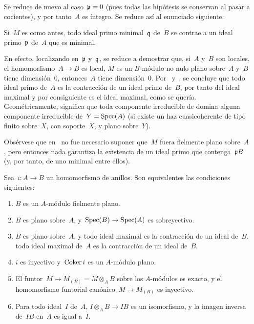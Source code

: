 Se reduce de nuevo al caso~$\mathfrak{p}=0$ (pues todas las hipótesis se
conservan al pasar a cocientes), y por tanto~$A$ es íntegro. Se reduce así al
enunciado siguiente:

\begin{corollaire}
\label{IV.2.5}
Si~$M$ es como antes, todo ideal primo minimal~$\mathfrak{q}$ de~$B$ se contrae
a un ideal primo~$\mathfrak{p}$ de~$A$ que es minimal.
\end{corollaire}

En efecto, localizando en~$\mathfrak{p}$ y~$\mathfrak{q}$, se reduce a demostrar que,
si~$A$ y~$B$ son locales, el homomorfismo~$A\to B$ es local, $M$ es un
$B$-módulo no nulo plano sobre~$A$ y~$B$ tiene dimensión~$0$, entonces~$A$
tiene dimensión~$0$. Por~ y~, se concluye que todo
ideal primo de~$A$ es la contracción de un ideal primo de~$B$, por tanto del
ideal maximal
y por consiguiente es el ideal maximal, como se quería. Geométricamente,
 significa que toda componente irreducible de
domina alguna componente irreducible de~$Y=\operatorname{Spec}(A)$ (si existe un haz
cuasicoherente de tipo finito sobre~$X$, con soporte~$X$, y plano sobre~$Y$).

Obsérvese que en~ no fue necesario suponer que~$M$ fuera
fielmente plano sobre~$A$, pero entonces nada garantiza la existencia de un
ideal primo que contenga~$\mathfrak{p}B$ (y, por tanto, de uno minimal entre
ellos).

\begin{proposition}
\label{IV.2.6}
Sea~$i\colon A\to B$ un homomorfismo de anillos. Son equivalentes las
condiciones siguientes:
\begin{enumerate}
\item[(i)] $B$ es un $A$-módulo fielmente plano.
\item[(ii)] $B$ es plano sobre~$A$, y~$\operatorname{Spec}(B)\to\operatorname{Spec}(A)$ es sobreyectivo.
\item[(ii~bis)] $B$ es plano sobre~$A$, y
{todo ideal maximal es la contracción de un ideal de~$B$.}
{todo ideal maximal de~$A$ es la contracción de un ideal de~$B$.}
\item[(iii)] $i$ es inyectivo y~$\operatorname{Coker} i$ es un $A$-módulo plano.
\item[(iv)] El funtor~$M\mapsto M_{(B)}=M\otimes_A B$ sobre los $A$-módulos
es exacto, y el homomorfismo funtorial canónico~$M\to M_{(B)}$ es inyectivo.
\item[(iv~bis)] Para todo ideal~$I$ de~$A$, $I\otimes_A B\to IB$ es un
isomorfismo, y la imagen inversa de~$IB$ en~$A$ es igual a~$I$.
\end{enumerate}
\end{proposition}

